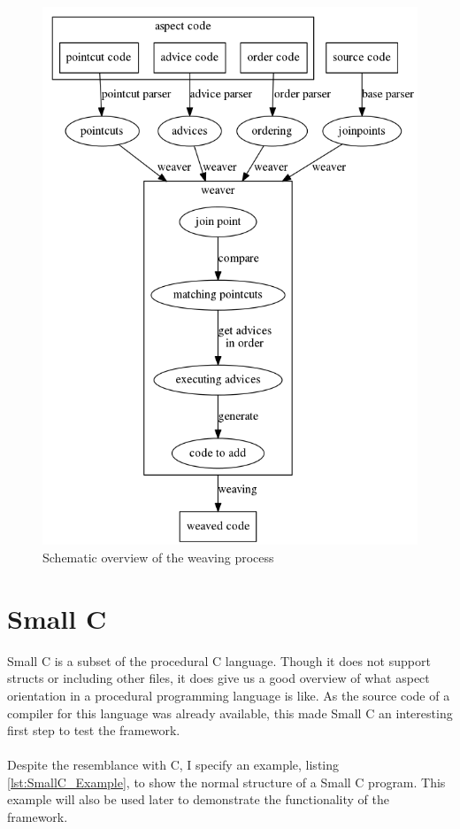 \documentclass[a4paper]{report}
\begin{document}
\begin{figure}
\centering
\includegraphics[scale=0.5]{images/AOF/weaving.png}
\caption{Schematic overview of the weaving process}
\label{fig:Weaving}
\end{figure}

\chapter{Small C}
\label{chap:SmallC}
Small C is a subset of the procedural C language. Though it does not support structs or including other files, it does give us a good overview of what aspect orientation in a procedural programming language is like. As the source code of a compiler for this language was already available, this made Small C an interesting first step to test the framework.\\
\\
Despite the resemblance with C, I specify an example, listing \ref{lst:SmallC_Example}, to show the normal structure of a Small C program. This example will also be used later to demonstrate the functionality of the framework.
\end{document}
